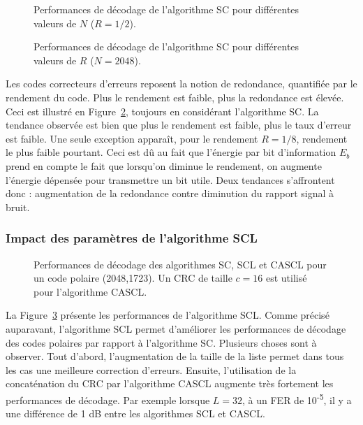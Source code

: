 \begin{figure}[h]
  \centering

\caption{Performances de décodage de l'algorithme SC pour différentes valeurs de $N$ ($R=1/2$).}
\label{fig:sc_n}
\end{figure}

\begin{figure}[h]
  \centering

\caption{Performances de décodage de l'algorithme SC pour différentes valeurs de $R$ ($N=2048$).}
\label{fig:sc_r}
\end{figure}
\clearpage
Les codes correcteurs d'erreurs reposent la notion de redondance, quantifiée par le rendement du code. Plus le rendement est faible, plus la redondance est élevée.
Ceci est illustré en Figure~\ref{fig:sc_r}, toujours en considérant l'algorithme SC. La tendance observée est bien que plus le rendement est faible, plus le taux d'erreur est faible.
Une seule exception apparaît, pour le rendement $R=1/8$, rendement le plus faible pourtant. Ceci est dû au fait que l'énergie par bit d'information $E_b$ prend en compte le fait que lorsqu'on diminue le rendement, on augmente l'énergie dépensée pour transmettre un bit utile. Deux tendances s'affrontent donc : augmentation de la redondance contre diminution du rapport signal à bruit.

\subsubsection{Impact des paramètres de l'algorithme SCL}

\begin{figure}[t]
  \centering
  
  \caption{Performances de décodage des algorithmes SC, SCL et CASCL pour un code polaire (2048,1723). Un CRC de taille $c=16$ est utilisé pour l'algorithme CASCL.}
  \label{fig:scl_l}
\end{figure}
La Figure~\ref{fig:scl_l} présente les performances de l'algorithme SCL. Comme précisé auparavant, l'algorithme SCL permet d'améliorer les performances de décodage des codes polaires par rapport à l'algorithme SC.
Plusieurs choses sont à observer. Tout d'abord, l'augmentation de la taille de la liste permet dans tous les cas une meilleure correction d'erreurs. Ensuite, l'utilisation de la concaténation du CRC par l'algorithme CASCL augmente très fortement les performances de décodage. Par exemple lorsque $L=32$, à un FER de 10\textsuperscript{-5}, il y a une différence de 1 dB entre les algorithmes SCL et CASCL.

